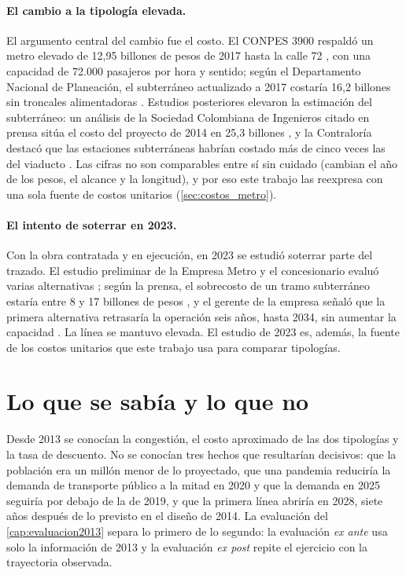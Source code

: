 \paragraph{El cambio a la tipología elevada.} El argumento central del cambio fue el costo. El
CONPES 3900 respaldó un metro elevado de 12,95 billones de pesos de 2017 hasta la calle 72
\citep{alcaldia2017conpes}, con una capacidad de 72.000 pasajeros por hora y sentido; según el
Departamento Nacional de Planeación, el subterráneo actualizado a 2017 costaría 16,2 billones sin
troncales alimentadoras \citep{semana2017}. Estudios posteriores elevaron la estimación del
subterráneo: un análisis de la Sociedad Colombiana de Ingenieros citado en prensa sitúa el costo del
proyecto de 2014 en 25,3 billones \citep{sci2023}, y la Contraloría destacó que las estaciones
subterráneas habrían costado más de cinco veces las del viaducto \citep{contraloria2022}. Las cifras
no son comparables entre sí sin cuidado (cambian el año de los pesos, el alcance y la longitud), y por
eso este trabajo las reexpresa con una sola fuente de costos unitarios (\cref{sec:costos_metro}).

\paragraph{El intento de soterrar en 2023.} Con la obra contratada y en ejecución, en 2023 se estudió
soterrar parte del trazado. El estudio preliminar de la Empresa Metro y el concesionario evaluó varias
alternativas \citep{emb2023}; según la prensa, el sobrecosto de un tramo subterráneo estaría entre 8 y
17 billones de pesos \citep{eltiempo2023}, y el gerente de la empresa señaló que la primera alternativa
retrasaría la operación seis años, hasta 2034, sin aumentar la capacidad \citep{narvaez2023}. La línea
se mantuvo elevada. El estudio de 2023 es, además, la fuente de los costos unitarios que este trabajo
usa para comparar tipologías.

\section{Lo que se sabía y lo que no}

Desde 2013 se conocían la congestión, el costo aproximado de las dos tipologías y la tasa de descuento.
No se conocían tres hechos que resultarían decisivos: que la población era un millón menor de lo
proyectado, que una pandemia reduciría la demanda de transporte público a la mitad en 2020 y que la
demanda en 2025 seguiría por debajo de la de 2019, y que la primera línea abriría en 2028, siete años
después de lo previsto en el diseño de 2014. La evaluación del \cref{cap:evaluacion2013} separa lo
primero de lo segundo: la evaluación \emph{ex ante} usa solo la información de 2013 y la evaluación
\emph{ex post} repite el ejercicio con la trayectoria observada.
